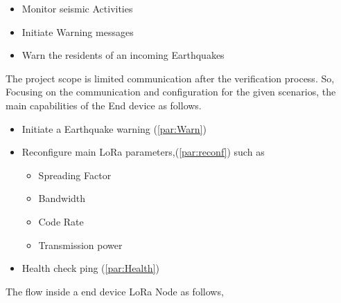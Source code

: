 \begin{itemize}
    \item Monitor seismic Activities
    \item Initiate Warning messages
    \item Warn the residents of an incoming Earthquakes
\end{itemize}

The project scope is limited communication after the verification process. So, Focusing on the communication and configuration for the given scenarios, the main capabilities of the End device as follows.

\begin{itemize}
    \item Initiate a Earthquake warning (\ref{par:Warn})
    \item Reconfigure main LoRa parameters,(\ref{par:reconf}) such as
    \begin{itemize}
        \item Spreading Factor
        \item Bandwidth
        \item Code Rate
        \item Transmission power
    \end{itemize}
    \item Health check ping (\ref{par:Health})
\end{itemize}

The flow inside a end device LoRa Node as follows,

